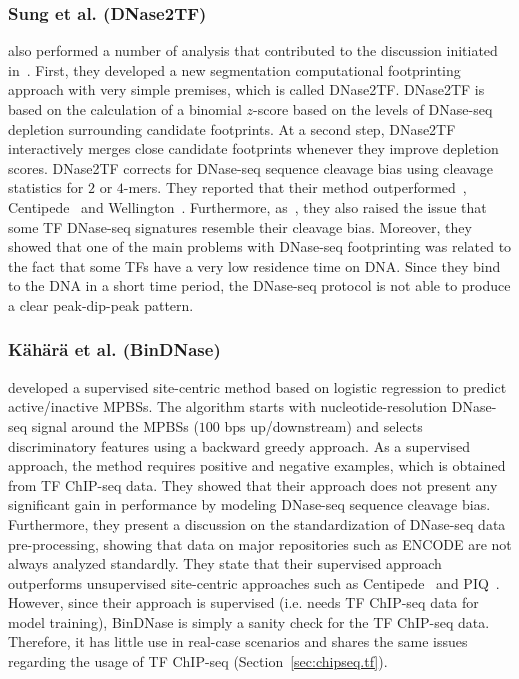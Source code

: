 \subsubsection{Sung et al. (DNase2TF)}

\cite{sung2014} also performed a number of analysis that contributed to the discussion initiated in~\cite{he2014}. First, they developed a new segmentation computational footprinting approach with very simple premises, which is called DNase2TF. DNase2TF is based on the calculation of a binomial $z$-score based on the levels of DNase-seq depletion surrounding candidate footprints. At a second step, DNase2TF interactively merges close candidate footprints whenever they improve depletion scores. DNase2TF corrects for DNase-seq sequence cleavage bias using cleavage statistics for $2$ or $4$-mers. They reported that their method outperformed~\cite{hesselberth2009}, Centipede~\citep{pique2011} and Wellington~\citep{piper2013}. Furthermore, as~\cite{he2014}, they also raised the issue that some TF DNase-seq signatures resemble their cleavage bias. Moreover, they showed that one of the main problems with DNase-seq footprinting was related to the fact that some TFs have a very low residence time on DNA. Since they bind to the DNA in a short time period, the DNase-seq protocol is not able to produce a clear peak-dip-peak pattern.

\subsubsection{K\"{a}h\"{a}r\"{a} et al. (BinDNase)}

\cite{kahara2015} developed a supervised site-centric method based on logistic regression to predict active/inactive MPBSs. The algorithm starts with nucleotide-resolution DNase-seq signal around the MPBSs ($100$ bps up/downstream) and selects discriminatory features using a backward greedy approach. As a supervised approach, the method requires positive and negative examples, which is obtained from TF ChIP-seq data. They showed that their approach does not present any significant gain in performance by modeling DNase-seq sequence cleavage bias. Furthermore, they present a discussion on the standardization of DNase-seq data pre-processing, showing that data on major repositories such as ENCODE are not always analyzed standardly. They state that their supervised approach outperforms unsupervised site-centric approaches such as Centipede~\citep{pique2011} and PIQ~\citep{sherwood2014}. However, since their approach is supervised (i.e. needs TF ChIP-seq data for model training), BinDNase is simply a sanity check for the TF ChIP-seq data. Therefore, it has little use in real-case scenarios and shares the same issues regarding the usage of TF ChIP-seq (Section~\ref{sec:chipseq.tf}).

